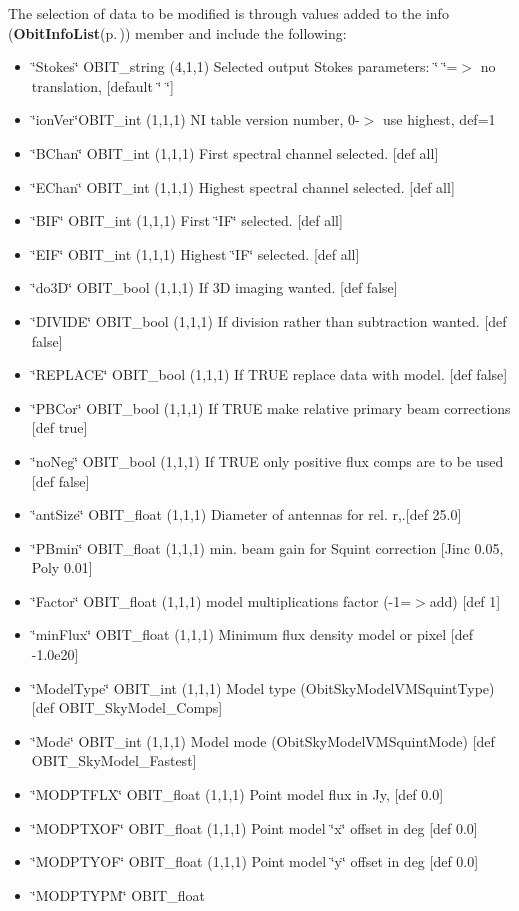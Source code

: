 The selection of data to be modified is through values added to the info ({\bf Obit\-Info\-List}{\rm (p.\,\pageref{structObitInfoList})}) member and include the following: \begin{itemize}
\item \char`\"{}Stokes\char`\"{} OBIT\_\-string (4,1,1) Selected output Stokes parameters: \char`\"{}    \char`\"{}=$>$ no translation, [default \char`\"{}    \char`\"{}] \item \char`\"{}ion\-Ver\char`\"{}OBIT\_\-int (1,1,1) NI table version number, 0-$>$ use highest, def=1 \item \char`\"{}BChan\char`\"{} OBIT\_\-int (1,1,1) First spectral channel selected. [def all] \item \char`\"{}EChan\char`\"{} OBIT\_\-int (1,1,1) Highest spectral channel selected. [def all] \item \char`\"{}BIF\char`\"{} OBIT\_\-int (1,1,1) First \char`\"{}IF\char`\"{} selected. [def all] \item \char`\"{}EIF\char`\"{} OBIT\_\-int (1,1,1) Highest \char`\"{}IF\char`\"{} selected. [def all] \item \char`\"{}do3D\char`\"{} OBIT\_\-bool (1,1,1) If 3D imaging wanted. [def false] \item \char`\"{}DIVIDE\char`\"{} OBIT\_\-bool (1,1,1) If division rather than subtraction wanted. [def false] \item \char`\"{}REPLACE\char`\"{} OBIT\_\-bool (1,1,1) If TRUE replace data with model. [def false] \item \char`\"{}PBCor\char`\"{} OBIT\_\-bool (1,1,1) If TRUE make relative primary beam corrections [def true] \item \char`\"{}no\-Neg\char`\"{} OBIT\_\-bool (1,1,1) If TRUE only positive flux comps are to be used [def false] \item \char`\"{}ant\-Size\char`\"{} OBIT\_\-float (1,1,1) Diameter of antennas for rel. r,.[def 25.0] \item \char`\"{}PBmin\char`\"{} OBIT\_\-float (1,1,1) min. beam gain for Squint correction [Jinc 0.05, Poly 0.01] \item \char`\"{}Factor\char`\"{} OBIT\_\-float (1,1,1) model multiplications factor (-1=$>$add) [def 1] \item \char`\"{}min\-Flux\char`\"{} OBIT\_\-float (1,1,1) Minimum flux density model or pixel [def -1.0e20] \item \char`\"{}Model\-Type\char`\"{} OBIT\_\-int (1,1,1) Model type (Obit\-Sky\-Model\-VMSquint\-Type) [def OBIT\_\-Sky\-Model\_\-Comps] \item \char`\"{}Mode\char`\"{} OBIT\_\-int (1,1,1) Model mode (Obit\-Sky\-Model\-VMSquint\-Mode) [def OBIT\_\-Sky\-Model\_\-Fastest] \item \char`\"{}MODPTFLX\char`\"{} OBIT\_\-float (1,1,1) Point model flux in Jy, [def 0.0] \item \char`\"{}MODPTXOF\char`\"{} OBIT\_\-float (1,1,1) Point model \char`\"{}x\char`\"{} offset in deg [def 0.0] \item \char`\"{}MODPTYOF\char`\"{} OBIT\_\-float (1,1,1) Point model \char`\"{}y\char`\"{} offset in deg [def 0.0] \item \char`\"{}MODPTYPM\char`\"{} OBIT\_\-float 
\end{itemize}
